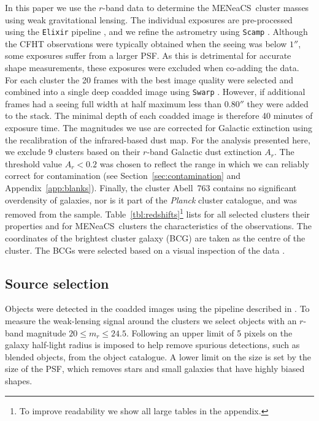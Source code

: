 \documentclass[useAMS,usenatbib]{mnras}
\newcommand{\mn}{MENeaCS}
\begin{document}
In this paper we use the $r$-band data to determine the \mn \ cluster masses using weak gravitational lensing. The individual exposures are pre-processed using the {\tt Elixir} pipeline \citep{magnier04}, and we refine the astrometry using {\tt Scamp} \citep{scamp}. Although the CFHT observations were typically obtained when the seeing was below $1''$, some exposures suffer from a larger PSF. As this is detrimental for accurate shape measurements, these exposures were excluded when co-adding the data. For each cluster the 20 frames with the best image quality were selected and combined into a single deep coadded image using {\tt Swarp} \citep{bertin10}. However, if additional frames had a seeing full width at half maximum less than $0.80''$ they were added to the stack. The minimal depth of each coadded image is therefore 40 minutes of exposure time. 
The magnitudes we use are corrected for Galactic extinction using the \cite{schlafly11} recalibration of the \cite{schlegel98} infrared-based dust map. 
For the analysis presented here, we exclude 9 clusters based on their $r$-band Galactic dust extinction $A_r$. 
The threshold value $A_r<0.2$ was chosen to reflect the range in which we can reliably correct for contamination (see Section~\ref{sec:contamination} and Appendix~\ref{app:blanks}).
Finally, the cluster Abell~763 contains no significant overdensity of galaxies, nor is it part of the \textit{Planck} cluster catalogue, and was removed from the sample. Table~\ref{tbl:redshifts}\footnote{To improve readability we show all large tables in the appendix.} lists for all selected clusters their properties and for \mn \ clusters the characteristics of the observations. The coordinates of the brightest cluster galaxy (BCG) are taken as the centre of the cluster. The BCGs were selected based on a visual inspection of the data \citep{bildfell08}.

\subsection{Source selection}

Objects were detected in the coadded images  using the pipeline described in \citet{hoekstra12}. To measure the weak-lensing signal around the clusters we select objects with an $r$-band magnitude $20\leq m_r \leq 24.5$. Following  an upper limit of 5 pixels on the galaxy half-light radius is imposed to help remove spurious detections, such as blended objects, from the object catalogue. A lower limit on the size is set by the size of the PSF, which removes stars and small galaxies that have highly biased shapes. 
\end{document}
